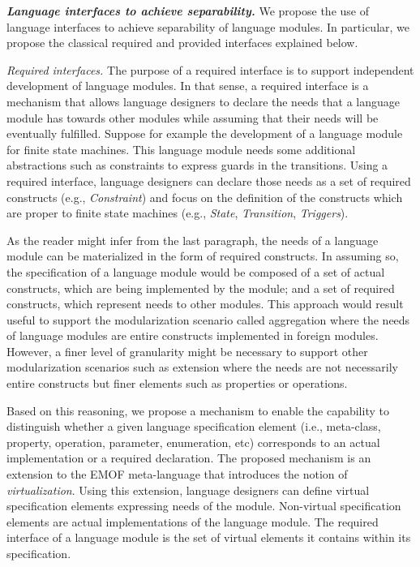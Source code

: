 \vspace{2mm}
\textbf{\textit{Language interfaces to achieve separability.}} We propose the use of language interfaces to achieve separability of language modules. In particular, we propose the classical required and provided interfaces explained below. 

\vspace{2mm}
\textit{Required interfaces.} The purpose of a required interface is to support independent development of language modules. In that sense, a required interface is a mechanism that allows language designers to declare the needs that a language module has towards other modules while assuming that their needs will be eventually fulfilled. Suppose for example the development of a language module for finite state machines. This language module needs some additional abstractions such as constraints to express guards in the transitions. Using a required interface, language designers can declare those needs as a set of required constructs (e.g., \textsl{Constraint}) and focus on the definition of the constructs which are proper to finite state machines (e.g., \textsl{State}, \textsl{Transition}, \textsl{Triggers}). 

As the reader might infer from the last paragraph, the needs of a language module can be materialized in the form of required constructs. In assuming so, the specification of a language module would be composed of a set of actual constructs, which are being implemented by the module; and a set of required constructs, which represent needs to other modules. This approach would result useful to support the modularization scenario called aggregation where the needs of language modules are entire constructs implemented in foreign modules. However, a finer level of granularity might be necessary to support other modularization scenarios such as extension where the needs are not necessarily entire constructs but finer elements such as properties or operations. 

Based on this reasoning, we propose a mechanism to enable the capability to distinguish whether a given language specification element (i.e., meta-class, property, operation, parameter, enumeration, etc) corresponds to an actual implementation or a required declaration. The proposed mechanism is an extension to the EMOF meta-language that introduces the notion of \textit{virtualization}. Using this extension, language designers can define virtual specification elements expressing needs of the module. Non-virtual specification elements are actual implementations of the language module. The required interface of a language module is the set of virtual elements it contains within its specification.

